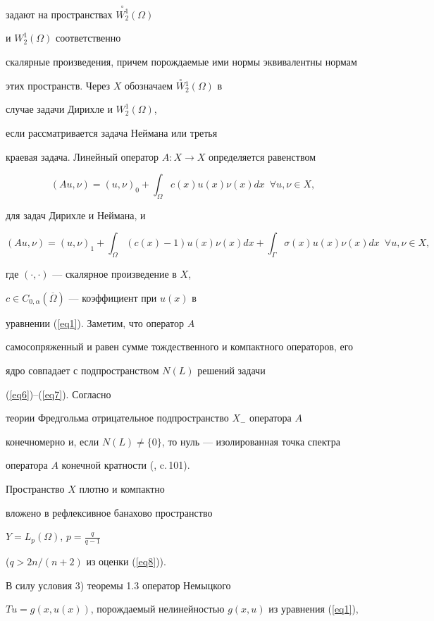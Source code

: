 задают на пространствах $\overset{\circ}{W_2^1}(\Omega)$


и $W_2^1(\Omega)$ соответственно


скалярные произведения, причем порождаемые ими нормы эквивалентны нормам


этих пространств. Через $X$ обозначаем $\overset{\circ}{W}{}_2^1(\Omega)$ в


случае задачи Дирихле и $W_2^1(\Omega)$,


если рассматривается задача Неймана или третья


краевая задача. Линейный оператор $A:X \to X$ определяется равенством


$$


(Au,\nu)=(u,\nu)_0+ \int_\Omega c(x)u(x)\nu(x) dx \ \; \forall u,\nu \in X,


$$


для задач Дирихле и Неймана, и


$$


(Au,\nu)=(u,\nu)_1+ \int_\Omega (c(x)-1)u(x)\nu(x) dx+


\int_\Gamma \sigma(x)u(x)\nu(x) dx \ \; \forall u,\nu \in X,


$$


где $(\cdot,\cdot)$ --- скалярное произведение в $X$,


$c \in C_{0,\alpha}(\overline{\Omega})$ --- коэффициент при $u(x)$ в


уравнении (\ref{eq1}). Заметим, что оператор $A$


самосопряженный и равен сумме тождественного и компактного операторов, его


ядро совпадает с подпространством $N(L)$ решений задачи


(\ref{eq6})--(\ref{eq7}). Согласно


теории Фредгольма отрицательное подпространство $X_{-}$ оператора $A$


конечномерно и, если $N(L) \ne\{0\}$, то нуль --- изолированная точка спектра


оператора $A$ конечной кратности (\cite{n22}, c.\,101).


Пространство $X$ плотно и компактно


вложено в рефлексивное банахово пространство


$Y=L_p(\Omega)$, $p=\frac{q}{q-1}$


($q>2n/(n+2)$ из оценки (\ref{eq8})).


В силу условия 3) теоремы 1.3 оператор Немыцкого


$Tu = g(x,u(x))$, порождаемый нелинейностью $g(x,u)$ из уравнения (\ref{eq1}),


